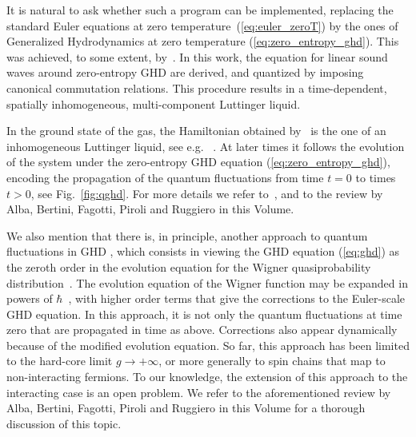 \documentclass[onecolumn,amsfonts,showpacs,superscriptaddress]{revtex4-1}
\begin{document}
It is natural to ask whether such a program can be implemented, replacing the standard Euler equations at zero temperature~(\ref{eq:euler_zeroT}) by the ones of Generalized Hydrodynamics at zero temperature (\ref{eq:zero_entropy_ghd}). This was achieved, to some extent, by~\cite{ruggiero2020quantum}. In this work, the equation for linear sound waves around zero-entropy GHD are derived, and quantized by imposing canonical commutation relations. This procedure results in a time-dependent, spatially inhomogeneous, multi-component Luttinger liquid.

In the ground state of the gas, the Hamiltonian obtained by~\cite{ruggiero2020quantum} is the one of an inhomogeneous Luttinger liquid, see e.g.~ \citep{cazalilla2004bosonizing,dubail2017conformal,brun2018inhomogeneous,bastianello2020entanglement}. At later times it follows the evolution of the system under the zero-entropy GHD equation (\ref{eq:zero_entropy_ghd}), encoding the propagation of the quantum fluctuations from time $t=0$ to times $t>0$, see Fig.~\ref{fig:qghd}. For more details we refer to~\citep{ruggiero2019conformal,ruggiero2020quantum,collura2020domain}, and to the review by Alba, Bertini, Fagotti, Piroli and Ruggiero in this Volume.


We also mention that there is, in principle, another approach to quantum fluctuations in GHD \citep{fagotti2017higher,fagotti2020locally}, which consists in viewing the GHD equation (\ref{eq:ghd}) as the zeroth order in the evolution equation for the Wigner quasiprobability distribution~\citep{moyal1949quantum,bettelheim2006orthogonality,bettelheim2011universal,bettelheim2012quantum,protopopov2013dynamics,doyon2017large,dean2018wigner,ruggiero2019conformal,dean2019nonequilibrium,fagotti2020locally}. The evolution equation of the Wigner function may be expanded in powers of  $\hbar$~\citep{moyal1949quantum}, with higher order terms that give the corrections to the Euler-scale GHD equation. In this approach, it is not only the quantum fluctuations at time zero that are propagated in time as above. Corrections also appear dynamically because of the modified evolution equation. So far, this approach has been limited to the hard-core limit $g \rightarrow + \infty$, or more generally to spin chains that map to non-interacting fermions. To our knowledge, the extension of this approach to the interacting case is an open problem. We refer to the aforementioned review by Alba, Bertini, Fagotti, Piroli and Ruggiero in this Volume for a thorough discussion of this topic.
\end{document}
